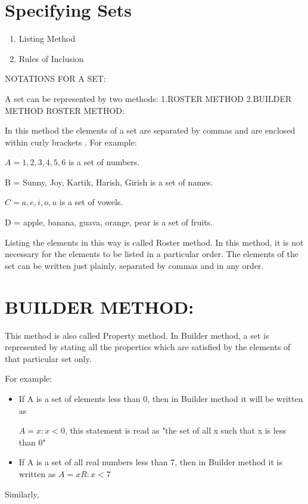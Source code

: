 \documentclass[12pt]{article}
\begin{document}
\section{Specifying Sets}



\begin{enumerate}
\item Listing Method
\item Rules of Inclusion
\end{enumerate}



NOTATIONS FOR A SET:

A set can be represented by two methods:
1.ROSTER METHOD
2.BUILDER METHOD
ROSTER METHOD:

In this method the elements of a set are separated by commas and are enclosed within curly brackets { }. For example:

$A = {1, 2, 3, 4, 5, 6}$ is a set of numbers.

B = {Sunny, Joy, Kartik, Harish, Girish} is a set of names.

$C = {a, e, i, o, u}$ is a set of vowels.

D = {apple, banana, guava, orange, pear} is a set of fruits.

Listing the elements in this way is called Roster method. In this method, it is not necessary for the elements to be listed in a particular order. The elements of the set can be written just plainly, separated by commas and in any order.


\section{BUILDER METHOD:}

This method is also called Property method. In Builder method, a set is represented by stating all the properties which are satisfied by the elements of that particular set only.

For example:
\begin{itemize}
\item If A is a set of elements less than 0, then in Builder method it will be written as

$A = {x: x < 0}$, this statement is read as "the set of all x such that x is less than 0"

\item If A is a set of all real numbers less than 7, then in Builder method it is written as $A = {x   R: x < 7}$
\end{itemize}
Similarly,
\end{document}

